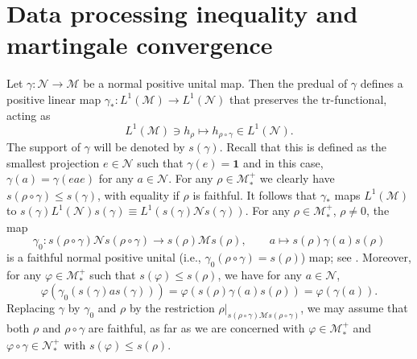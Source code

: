 \documentclass[12pt]{article}
\theoremstyle{definition}
\theoremstyle{remark}
\numberwithin{equation}{section}
\def\Me{\mathcal M}
\def\Ne{\mathcal N}
\def\Tr{\mathrm{tr}}
\def\ffi{\varphi}
\def\1{\mathbf{1}}
\begin{document}
\section{Data processing inequality and martingale convergence}

Let  $\gamma: \Ne\to \Me$ be a normal positive unital map. Then the  predual of $\gamma$  defines a 
positive linear map $\gamma_*: L^1(\Me)\to L^1(\Ne)$ that preserves the $\Tr$-functional,
acting as
\[
L^1(\Me)\ni h_\rho\mapsto h_{\rho\circ\gamma} \in L^1(\Ne).
\]
The support
of $\gamma$ will be denoted by $s(\gamma)$. Recall that this is defined as the smallest projection
$e\in \Ne$ such that $\gamma(e)=\1$ and in this case, $\gamma(a)=\gamma(eae)$ for any $a\in
\Ne$. For any $\rho\in \Me_*^+$ we clearly have
$s(\rho\circ\gamma)\le s(\gamma)$, with equality if $\rho$ is faithful. 
It follows that $\gamma_*$ maps $L^1(\Me)$ to $s(\gamma)L^1(\Ne)s(\gamma)\equiv
L^1(s(\gamma)\Ne s(\gamma))$.  For any $\rho\in \Me_*^+$, $\rho\ne 0$, the map
\[
\gamma_0: {s(\rho\circ\gamma)\Ne s(\rho\circ\gamma)}\to s(\rho)\Me s(\rho),
\qquad a\mapsto s(\rho) \gamma(a)s(\rho)
\]
is a faithful normal positive unital {(i.e., $\gamma_0(\rho\circ\gamma)=s(\rho)$)} map;
{see \cite[Remark 6.7]{hiai2021lectures}.} Moreover, for any $\ffi\in \Me_*^+$ such that
$s(\ffi)\le s(\rho)$, we have for any $a\in \Ne$,
\[
\ffi(\gamma_0(s(\gamma)as(\gamma)))=\ffi(s(\rho)\gamma(a)s(\rho))={\ffi(\gamma(a)).}
\]
Replacing $\gamma$ by $\gamma_0$ and $\rho$ by the restriction
$\rho|_{s(\rho\circ\gamma)\Me s(\rho\circ\gamma)}$, we may  assume that both $\rho$
and $\rho\circ\gamma$ are faithful, as far as we are concerned with $\ffi\in\Me_*^+$ and
$\ffi\circ\gamma\in\Ne_*^+$ with $s(\ffi)\le s(\rho)$.
\end{document}
